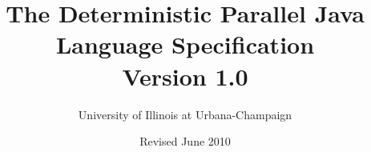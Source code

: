 \documentclass[10pt]{article}
\title{\bfseries{The Deterministic Parallel Java Language
    Specification \\
Version 1.0}}
\author{University of Illinois at Urbana-Champaign}
\date{Revised June 2010}
\begin{document}
\maketitle

\tableofcontents

\begin{sloppypar}









\end{sloppypar}
\end{document}
